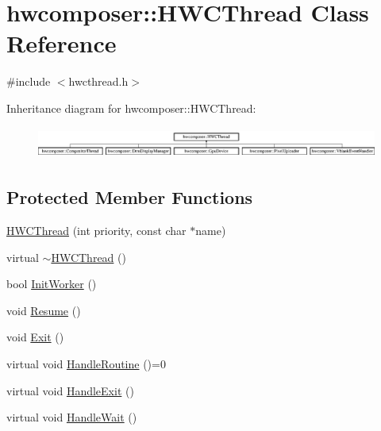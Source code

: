 \hypertarget{classhwcomposer_1_1HWCThread}{}\section{hwcomposer\+:\+:H\+W\+C\+Thread Class Reference}
\label{classhwcomposer_1_1HWCThread}


{\ttfamily \#include $<$hwcthread.\+h$>$}

Inheritance diagram for hwcomposer\+:\+:H\+W\+C\+Thread\+:\begin{figure}[H]
\begin{center}
\leavevmode
\includegraphics[height=1.051643cm]{classhwcomposer_1_1HWCThread}
\end{center}
\end{figure}
\subsection*{Protected Member Functions}
\begin{DoxyCompactItemize}
\item 
\mbox{\hyperlink{classhwcomposer_1_1HWCThread_a8780175b1679005955a94aa89fa62be1}{H\+W\+C\+Thread}} (int priority, const char $\ast$name)
\item 
virtual \mbox{\hyperlink{classhwcomposer_1_1HWCThread_a48920a9e68258c345e5fc7d8507d7ce4}{$\sim$\+H\+W\+C\+Thread}} ()
\item 
bool \mbox{\hyperlink{classhwcomposer_1_1HWCThread_a7162d49a6b4026673f77ac048eb4d07b}{Init\+Worker}} ()
\item 
void \mbox{\hyperlink{classhwcomposer_1_1HWCThread_a5f38525b892525beaa7f37d2d4c50bde}{Resume}} ()
\item 
void \mbox{\hyperlink{classhwcomposer_1_1HWCThread_aa360360e4c27cbc7fed745f79990a190}{Exit}} ()
\item 
virtual void \mbox{\hyperlink{classhwcomposer_1_1HWCThread_a539ea080e6bf0e6cffe08e2341be1ee4}{Handle\+Routine}} ()=0
\item 
virtual void \mbox{\hyperlink{classhwcomposer_1_1HWCThread_a39a94bd0b12451fe3060729787921cbf}{Handle\+Exit}} ()
\item 
virtual void \mbox{\hyperlink{classhwcomposer_1_1HWCThread_ab5acded48bbd1bf4d7c3a54dadb91ef9}{Handle\+Wait}} ()
\end{DoxyCompactItemize}
